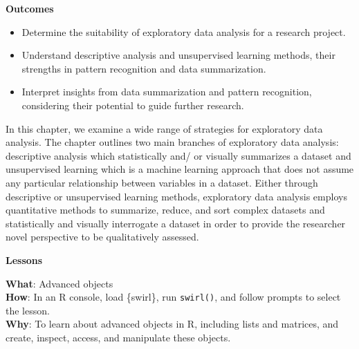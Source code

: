 \documentclass[
  letterpaper,
  krantz1]{latex/krantz-mod}
\providecommand{\tightlist}{%
  \setlength{\itemsep}{0pt}\setlength{\parskip}{0pt}}\usepackage{longtable,booktabs,array}
\newcommand{\setDOI}[1]{\gdef\doi{#1}}
\theoremstyle{definition}
\theoremstyle{definition}
\theoremstyle{remark}
\begin{document}
\setDOI{10.4324/9781003393764.8}
\thispagestyle{chapterfirstpage}

\begin{tcolorbox}[enhanced jigsaw, leftrule=.75mm, colframe=quarto-callout-color-frame, left=2mm, colback=white, toprule=.15mm, breakable, arc=.35mm, opacityback=0, bottomrule=.15mm, rightrule=.15mm]

\textbf{ Outcomes}

\begin{itemize}
\tightlist
\item
  Determine the suitability of exploratory data analysis for a research
  project.
\item
  Understand descriptive analysis and unsupervised learning methods,
  their strengths in pattern recognition and data summarization.
\item
  Interpret insights from data summarization and pattern recognition,
  considering their potential to guide further research.
\end{itemize}

\end{tcolorbox}

In this chapter, we examine a wide range of strategies for exploratory
data analysis. The chapter outlines two main branches of exploratory
data analysis: descriptive analysis which statistically and/ or visually
summarizes a dataset and unsupervised learning which is a machine
learning approach that does not assume any particular relationship
between variables in a dataset. Either through descriptive or
unsupervised learning methods, exploratory data analysis employs
quantitative methods to summarize, reduce, and sort complex datasets and
statistically and visually interrogate a dataset in order to provide the
researcher novel perspective to be qualitatively assessed.

\begin{tcolorbox}[enhanced jigsaw, leftrule=.75mm, colframe=quarto-callout-color-frame, left=2mm, colback=white, toprule=.15mm, breakable, arc=.35mm, opacityback=0, bottomrule=.15mm, rightrule=.15mm]

\textbf{ Lessons}

\textbf{What}: Advanced objects\\
\textbf{How}: In an R console, load \{swirl\}, run \texttt{swirl()}, and
follow prompts to select the lesson.\\
\textbf{Why}: To learn about advanced objects in R, including lists and
matrices, and create, inspect, access, and manipulate these objects.

\end{tcolorbox}
\end{document}
